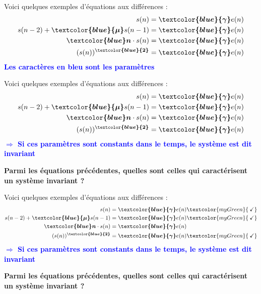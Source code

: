 \documentclass[a4paper,11pt]{beamer}
\begin{document}
\begin{frame}
\justifying
Voici quelques exemples d'équations aux différences :
\setcounter{equation}{0}
\begin{align}
  s(n) &= \bm{\textcolor{blue}{\gamma}} e(n)\\
  s(n-2) + \bm{\textcolor{blue}{\mu}} s(n-1) &= \bm{\textcolor{blue}{\gamma}}
  e(n)\\
  \bm{\textcolor{blue}n} \cdot s(n) &= \bm{\textcolor{blue}{\gamma}} e(n)\\
  (s(n))^{\bm{\textcolor{blue}{2}}} &= \bm{\textcolor{blue}{\gamma}} e(n)
\end{align}
\centering
\textcolor{blue}{\textbf{Les caractères en bleu sont les paramètres}}
\end{frame}

\begin{frame}
\justifying
Voici quelques exemples d'équations aux différences :
\setcounter{equation}{0}
\begin{align}
  s(n) &= \bm{\textcolor{blue}{\gamma}} e(n)\\
  s(n-2) + \bm{\textcolor{blue}{\mu}} s(n-1) &= \bm{\textcolor{blue}{\gamma}}
  e(n)\\
  \bm{\textcolor{blue}n} \cdot s(n) &= \bm{\textcolor{blue}{\gamma}} e(n)\\
  (s(n))^{\bm{\textcolor{blue}{2}}} &= \bm{\textcolor{blue}{\gamma}} e(n)
\end{align}
\centering
\textcolor{blue}{\textbf{$\Rightarrow$ Si ces paramètres sont constants dans le
temps, le système est dit invariant}}
\vspace{1cm}

\pause
\textcolor{myGreen}{\textbf{Parmi les équations précédentes, quelles sont celles
qui caractérisent un système invariant ?}}
\end{frame}

\begin{frame}
\justifying
Voici quelques exemples d'équations aux différences :
\setcounter{equation}{0}
\begin{align}
  s(n) &= \bm{\textcolor{blue}{\gamma}} e(n)\textcolor{myGreen}{\:\checkmark}\\
  s(n-2) + \bm{\textcolor{blue}{\mu}} s(n-1) &= \bm{\textcolor{blue}{\gamma}}
  e(n)\textcolor{myGreen}{\:\checkmark}\\
  \bm{\textcolor{blue}n} \cdot s(n) &= \bm{\textcolor{blue}{\gamma}} e(n)\\
  (s(n))^{\bm{\textcolor{blue}{2}}} &= \bm{\textcolor{blue}{\gamma}} e(n)\textcolor{myGreen}{\:\checkmark}
\end{align}
\centering
\textcolor{blue}{\textbf{$\Rightarrow$ Si ces paramètres sont constants dans le
temps, le système est dit invariant}}
\vspace{1cm}

\textcolor{myGreen}{\textbf{Parmi les équations précédentes, quelles sont celles
qui caractérisent un système invariant ?}}
\end{frame}
\end{document}
